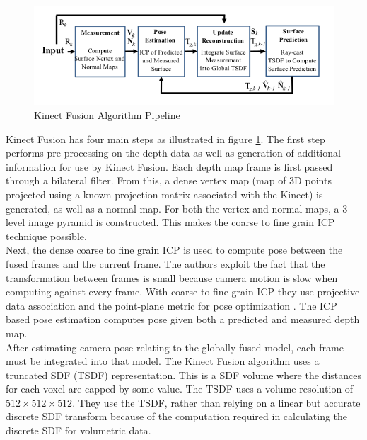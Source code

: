 \begin{figure}[!htb]
\centering
\includegraphics[width=12cm]{images/ch1/Newcombe11KinectFusion1}
\caption{Kinect Fusion Algorithm Pipeline \cite{Newcombe11Kinectfusion}}
\label{KFusionPipeliciteHne}
\end{figure}

Kinect Fusion has four main steps as illustrated in figure \ref{KFusionPipeliciteHne}. The first step performs pre-processing on the depth data as well as generation of additional information for use by Kinect Fusion. Each depth map frame is first passed through a bilateral filter. From this, a dense vertex map (map of 3D points projected using a known projection matrix associated with the Kinect) is generated, as well as a normal map. For both the vertex and normal maps, a 3-level image pyramid is constructed. This makes the coarse to fine grain ICP technique possible. \\

Next, the dense coarse to fine grain ICP is used to compute pose between the fused frames and the current frame. The authors exploit the fact that the transformation between frames is small because camera motion is slow when computing against every frame. With coarse-to-fine grain ICP they use projective data association \cite{Blais95Registering} and the point-plane metric for pose optimization \cite{Rusinkiewicz02Real}. The ICP based pose estimation computes pose given both a predicted and measured depth map. \\

After estimating camera pose relating to the globally fused model, each frame must be integrated into that model. The Kinect Fusion algorithm uses a truncated SDF (TSDF) representation. This is a SDF volume where the distances for each voxel are capped by some value. The TSDF uses a volume resolution of $512\times 512\times 512$. They use the TSDF, rather than relying on a linear but accurate discrete SDF transform \cite{Rasch09Remarks} because of the computation required in calculating the discrete SDF for volumetric data. \\

